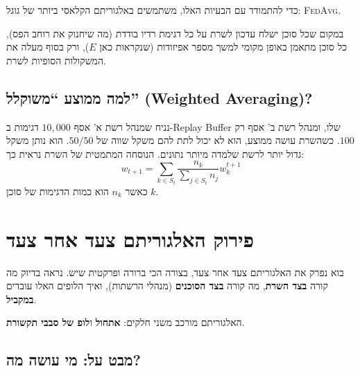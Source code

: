 \documentclass[11pt,a4paper]{article}
\newcommand{\FedAvg}{\textsc{FedAvg}}
\begin{document}
כדי להתמודד עם הבעיות האלו, משתמשים באלגוריתם הקלאסי ביותר של גוגל: \FedAvg.

במקום שכל סוכן ישלח עדכון לשרת על כל דגימת רדיו בודדת (מה שיחנוק את רוחב הפס), כל סוכן מתאמן באופן מקומי למשך מספר אפיזודות (שנקראות כאן $E$), ורק בסוף מעלה את המשקולות הסופיות לשרת.

\subsection{למה ממוצע ``משוקלל'' (Weighted Averaging)?}

נניח שמנהל רשת א' אסף $10{,}000$ דגימות ב-Replay Buffer שלו, ומנהל רשת ב' אסף רק $100$.
כשהשרת עושה ממוצע, הוא לא יכול לתת להם משקל שווה של $50/50$.
הוא נותן משקל גדול יותר לרשת שלמדה מיותר נתונים.
הנוסחה המתמטית של השרת נראית כך:
\begin{equation}
  w_{t+1} = \sum_{k \in S_t} \frac{n_k}{\sum_{j \in S_t} n_j} w_k^{t+1}
  \label{eq:fedavg-weighted}
\end{equation}
כאשר $n_k$ הוא כמות הדגימות של סוכן $k$.

\section{פירוק האלגוריתם צעד אחר צעד}
\label{sec:algorithm-breakdown}

בוא נפרק את האלגוריתם צעד אחר צעד, בצורה הכי ברורה ופרקטית שיש.
נראה בדיוק מה קורה \textbf{בצד השרת}, מה קורה \textbf{בצד הסוכנים} (מנהלי הרשתות), ואיך הלופים האלו עובדים \textbf{במקביל}.

האלגוריתם מורכב משני חלקים: \textbf{אתחול} ו\textbf{לופ של סבבי תקשורת}.

\subsection{מבט על: מי עושה מה?}
\end{document}
